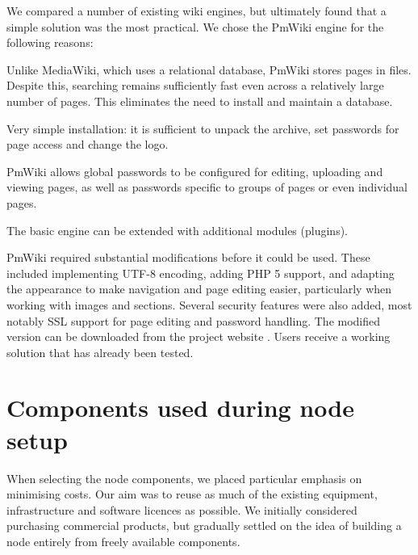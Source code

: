 We compared a number of existing wiki engines, but ultimately found that a simple solution was the most practical. We chose the PmWiki engine for the following reasons:
\begin{paklist}
\item Unlike MediaWiki, which uses a relational database, PmWiki stores pages in files. Despite this, searching remains sufficiently fast even across a relatively large number of pages. This eliminates the need to install and maintain a database.

\item Very simple installation: it is sufficient to unpack the archive, set passwords for page access and change the logo.

\item PmWiki allows global passwords to be configured for editing, uploading and viewing pages, as well as passwords specific to groups of pages or even individual pages.

\item The basic engine can be extended with additional modules (plugins).
\end{paklist}

PmWiki required substantial modifications before it could be used. These included implementing UTF-8 encoding, adding PHP 5 support, and adapting the appearance to make navigation and page editing easier, particularly when working with images and sections. Several security features were also added, most notably SSL support for page editing and password handling. The modified version can be downloaded from the project website \cite{CIANT-AGnodeWiki}. Users receive a working solution that has already been tested.

\section{Components used during node setup} \label{kap:CiantAGKomponenty}
When selecting the node components, we placed particular emphasis on minimising costs. Our aim was to reuse as much of the existing equipment, infrastructure and software licences as possible. We initially considered purchasing commercial products, but gradually settled on the idea of building a node entirely from freely available components.

